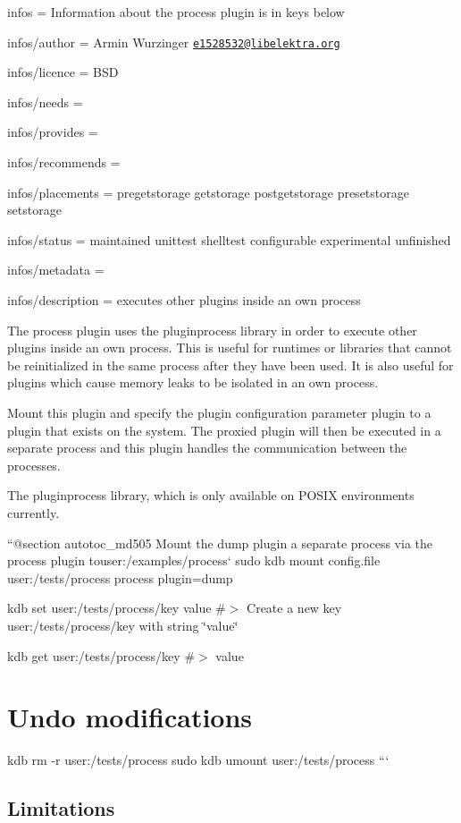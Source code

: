 
\begin{DoxyItemize}
\item infos = Information about the process plugin is in keys below
\item infos/author = Armin Wurzinger \href{mailto:e1528532@libelektra.org}{\tt e1528532@libelektra.\+org}
\item infos/licence = B\+SD
\item infos/needs =
\item infos/provides =
\item infos/recommends =
\item infos/placements = pregetstorage getstorage postgetstorage presetstorage setstorage
\item infos/status = maintained unittest shelltest configurable experimental unfinished
\item infos/metadata =
\item infos/description = executes other plugins inside an own process
\end{DoxyItemize}

The process plugin uses the {\ttfamily pluginprocess} library in order to execute other plugins inside an own process. This is useful for runtimes or libraries that cannot be reinitialized in the same process after they have been used. It is also useful for plugins which cause memory leaks to be isolated in an own process.

Mount this plugin and specify the plugin configuration parameter {\ttfamily plugin} to a plugin that exists on the system. The proxied plugin will then be executed in a separate process and this plugin handles the communication between the processes.

The {\ttfamily pluginprocess} library, which is only available on P\+O\+S\+IX environments currently.

``{\ttfamily  @section autotoc\+\_\+md505 Mount the dump plugin a separate process via the process plugin to}user\+:/examples/process` sudo kdb mount config.\+file user\+:/tests/process process plugin=dump

kdb set user\+:/tests/process/key value \#$>$ Create a new key user\+:/tests/process/key with string \char`\"{}value\char`\"{}

kdb get user\+:/tests/process/key \#$>$ value\hypertarget{autotoc_md501_autotoc_md506}{}\section{Undo modifications}\label{autotoc_md501_autotoc_md506}
kdb rm -\/r user\+:/tests/process sudo kdb umount user\+:/tests/process ```\hypertarget{autotoc_md501_autotoc_md507}{}\subsection{Limitations}\label{autotoc_md501_autotoc_md507}

